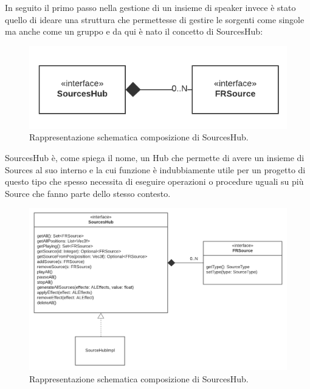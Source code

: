 \documentclass[a4paper,12pt]{report}
\begin{document}
In seguito il primo passo nella gestione di un insieme di speaker invece è stato quello di ideare una struttura che permettesse di gestire le sorgenti come singole ma anche come un gruppo e da qui è nato il concetto di SourcesHub:
%
\begin{figure}[H]
\centering{}
\includegraphics[width=\textwidth]{img/source/SourcesHub-Source.png}
\caption{Rappresentazione schematica composizione di SourcesHub.}
\label{img:sourcesHubIdea}
\end{figure}

SourcesHub è, come spiega il nome, un Hub che permette di avere un insieme di Sources al suo interno e la cui funzione è indubbiamente utile per un progetto di questo tipo che spesso necessita di eseguire operazioni o procedure uguali su più Source che fanno parte dello stesso contesto.
%
\begin{figure}[H]
\centering{}
\includegraphics[width=\textwidth]{img/source/SourcesHub-Source-deeper.png}
\caption{Rappresentazione schematica composizione di SourcesHub.}
\label{img:sourcesHub}
\end{figure}
\end{document}
